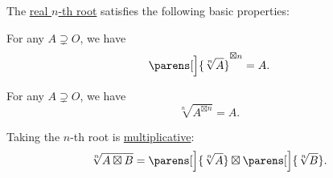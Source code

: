 \begin{proposition}\label{thm:def:principal_nonnegative_nth_root}
  The \hyperref[def:principal_nonnegative_nth_root]{real \( n \)-th root} satisfies the following basic properties:
  \begin{thmenum}
     For any \( A \supsetneq O \), we have
    \begin{equation}\label{eq:thm:def:principal_nonnegative_nth_root/power_of_root}
      \parens[\Big]{ \sqrt[n]{ A } }^{\boxtimes n} = A.
    \end{equation}

     For any \( A \supsetneq O \), we have
    \begin{equation}\label{eq:thm:def:principal_nonnegative_nth_root/root_of_power}
      \sqrt[n]{ A^{\boxtimes n} } = A.
    \end{equation}

     Taking the \( n \)-th root is \hyperref[def:multiplicative_function]{multiplicative}:
    \begin{equation}\label{eq:thm:def:principal_nonnegative_nth_root/multiplicative}
      \sqrt[n]{ A \boxtimes B } = \parens[\Big]{\sqrt[n]{ A }} \boxtimes \parens[\Big]{\sqrt[n]{ B }}.
    \end{equation}
  \end{thmenum}
\end{proposition}
